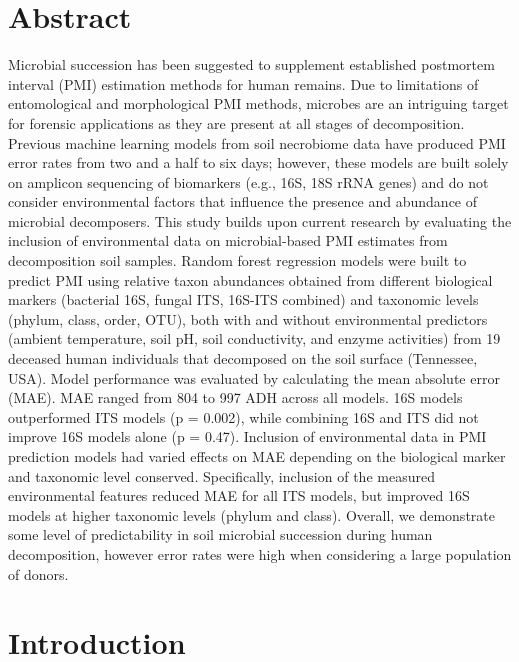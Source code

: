 \documentclass[
  10pt,
  letterpaper,
]{article}
\begin{document}
\section*{Abstract}
Microbial succession has been suggested to supplement established
postmortem interval (PMI) estimation methods for human remains. Due to
limitations of entomological and morphological PMI methods, microbes are
an intriguing target for forensic applications as they are present at
all stages of decomposition. Previous machine learning models from soil
necrobiome data have produced PMI error rates from two and a half to six
days; however, these models are built solely on amplicon sequencing of
biomarkers (e.g., 16S, 18S rRNA genes) and do not consider environmental
factors that influence the presence and abundance of microbial
decomposers. This study builds upon current research by evaluating the
inclusion of environmental data on microbial-based PMI estimates from
decomposition soil samples. Random forest regression models were built
to predict PMI using relative taxon abundances obtained from different
biological markers (bacterial 16S, fungal ITS, 16S-ITS combined) and
taxonomic levels (phylum, class, order, OTU), both with and without
environmental predictors (ambient temperature, soil pH, soil
conductivity, and enzyme activities) from 19 deceased human individuals
that decomposed on the soil surface (Tennessee, USA). Model performance
was evaluated by calculating the mean absolute error (MAE). MAE ranged
from 804 to 997 ADH across all models. 16S models outperformed ITS
models (p = 0.002), while combining 16S and ITS did not improve 16S
models alone (p = 0.47). Inclusion of environmental data in PMI
prediction models had varied effects on MAE depending on the biological
marker and taxonomic level conserved. Specifically, inclusion of the
measured environmental features reduced MAE for all ITS models, but
improved 16S models at higher taxonomic levels (phylum and class).
Overall, we demonstrate some level of predictability in soil microbial
succession during human decomposition, however error rates were high
when considering a large population of donors.


\linenumbers\hypertarget{introduction}{%
\section{Introduction}\label{introduction}}
\end{document}
